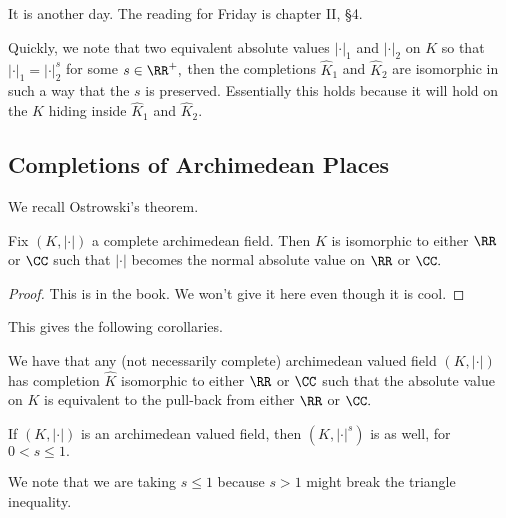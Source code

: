 















It is another day. The reading for Friday is chapter II, \S4.

Quickly, we note that two equivalent absolute values $|\cdot|_1$ and $|\cdot|_2$ on $K$ so that $|\cdot|_1=|\cdot|_2^s$ for some $s\in\RR^+,$ then the completions $\hat K_1$ and $\hat K_2$ are isomorphic in such a way that the $s$ is preserved. Essentially this holds because it will hold on the $K$ hiding inside $\hat K_1$ and $\hat K_2.$

\subsection{Completions of Archimedean Places}
We recall Ostrowski's theorem.
\begin{theorem}[Ostrowski]
	Fix $(K,|\cdot|)$ a complete archimedean field. Then $K$ is isomorphic to either $\RR$ or $\CC$ such that $|\cdot|$ becomes the normal absolute value on $\RR$ or $\CC.$
\end{theorem}
\begin{proof}
	This is in the book. We won't give it here even though it is cool.
\end{proof}
This gives the following corollaries.
\begin{corollary}
	We have that any (not necessarily complete) archimedean valued field $(K,|\cdot|)$ has completion $\hat K$ isomorphic to either $\RR$ or $\CC$ such that the absolute value on $K$ is equivalent to the pull-back from either $\RR$ or $\CC.$
\end{corollary}
\begin{corollary}
	If $(K,|\cdot|)$ is an archimedean valued field, then $(K,|\cdot|^s)$ is as well, for $0<s\le1.$
\end{corollary}
We note that we are taking $s\le1$ because $s>1$ might break the triangle inequality.

